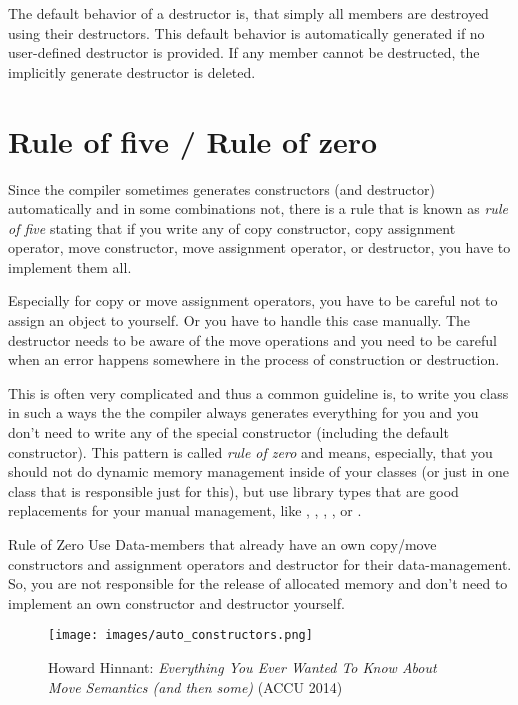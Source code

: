 The default behavior of a destructor is, that simply all members are destroyed using their destructors. This default behavior is automatically generated if
no user-defined destructor is provided. If any member cannot be destructed, the implicitly generate destructor is deleted.

\section{Rule of five / Rule of zero}

Since the compiler sometimes generates constructors (and destructor) automatically and in some combinations not, there is a rule that is known as
\emph{rule of five} stating that if you write any of copy constructor, copy assignment operator, move constructor, move assignment operator, or destructor,
you have to implement them all.

Especially for copy or move assignment operators, you have to be careful not to assign an object to yourself. Or you have to handle this case manually. The
destructor needs to be aware of the move operations and you need to be careful when an error happens somewhere in the process of construction or destruction.

This is often very complicated and thus a common guideline is, to write you class in such a ways the the compiler always generates everything for you and you
don't need to write any of the special constructor (including the default constructor). This pattern is called \emph{rule of zero} and means, especially,
that you should not do dynamic memory management inside of your classes (or just in one class that is responsible just for this), but use library types that
are good replacements for your manual management, like , , , , or .

\begin{guideline}{Rule of Zero}
  Use Data-members that already have an own copy/move constructors and assignment operators and destructor for their data-management. So, you are not
  responsible for the release of allocated memory and don't need to implement an own constructor and destructor yourself.
\end{guideline}

\begin{figure}[ht]
\begin{center}
\texttt{[image: images/auto\_constructors.png]}
\caption{Howard Hinnant: \emph{Everything You Ever Wanted To Know About Move Semantics (and then some)} (ACCU 2014)}
\end{center}
\end{figure}

